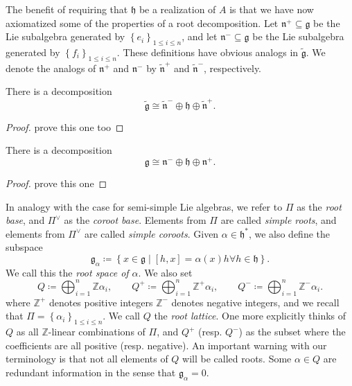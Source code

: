 \documentclass[11pt, letterpaper]{article}
\theoremstyle{plain}
\begin{document}
The benefit of requiring that $\mathfrak{h} $ be a realization of $A$ is that we have now axiomatized some of the properties of a root decomposition. Let $\mathfrak{n}^+ \subseteq \mathfrak{g}$ be the Lie subalgebra generated by $\left\{ e_i \right\}_{1\leq i\leq n} $, and let $\mathfrak{n}^-\subseteq \mathfrak{g}$ be the Lie subalgebra generated by $\left\{ f_i \right\}_{1\leq i\leq n} $. These definitions have obvious analogs in $\widetilde{\mathfrak{g} } $. We denote the analogs of $\mathfrak{n} ^+$ and $\mathfrak{n} ^-$ by $\widetilde{\mathfrak{n} } ^+$ and $\widetilde{\mathfrak{n} } ^-$, respectively.

\begin{lemma}\label{lma:3-6}
	There is a decomposition
	\[
		\widetilde{\mathfrak{g} } \cong \widetilde{\mathfrak{n} } ^- \oplus \mathfrak{h} \oplus \widetilde{\mathfrak{n} } ^+
	.\]
\end{lemma}
\begin{proof}
	prove this one too
\end{proof}


\begin{proposition}\label{prp:3-7}
	There is a decomposition
	\[
		\mathfrak{g} \cong \mathfrak{n} ^- \oplus \mathfrak{h} \oplus \mathfrak{n} ^+
	.\]
\end{proposition}
\begin{proof}
	prove this one
\end{proof}

In analogy with the case for semi-simple Lie algebras, we refer to $\Pi $ as the \emph{root base}, and $\Pi ^\vee $ as the \emph{coroot base}. Elements from $\Pi $ are called \emph{simple roots}, and elements from $\Pi ^\vee $ are called \emph{simple coroots}. Given $\alpha \in \mathfrak{h} ^*$, we also define the subspace
\[
	\mathfrak{g} _{\alpha } \coloneqq \left\{ x\in \mathfrak{g} \mid [h,x]=\alpha (x)h \forall h\in \mathfrak{h}  \right\} 
.\]
We call this the \emph{root space of $\alpha $}. We also set
\[
	Q\coloneqq \bigoplus_{i=1}^n \mathbb{Z} \alpha _i,\qquad Q^+ \coloneqq \bigoplus_{i=1}^{n} \mathbb{Z} ^+\alpha _i,\qquad Q^- \coloneqq \bigoplus_{i=1}^{n} \mathbb{Z} ^-\alpha _i.
\]
where $\mathbb{Z} ^+$ denotes positive integers $\mathbb{Z} ^-$ denotes negative integers, and we recall that $\Pi =\left\{ \alpha _i \right\}_{1\leq i\leq n}$. We call $Q$ the \emph{root lattice}. One more explicitly thinks of $Q$ as all $\mathbb{Z} $-linear combinations of $\Pi $, and $Q^+$ (resp. $Q^-$) as the subset where the coefficients are all positive (resp. negative). An important warning with our terminology is that not all elements of $Q$ will be called roots. Some $\alpha \in Q$ are redundant information in the sense that $\mathfrak{g} _{\alpha } =0$.
\end{document}
